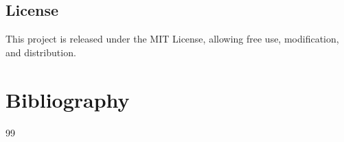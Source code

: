 \documentclass[12pt,a4paper]{report}
\begin{document}
\section{License}
\label{sec:license}

This project is released under the MIT License, allowing free use, modification, and distribution.

\cleardoublepage

\chapter{Bibliography}
\thispagestyle{fancy}
\label{chap:bibliography}

\begin{thebibliography}{99}


\small











\end{thebibliography}
\end{document}
